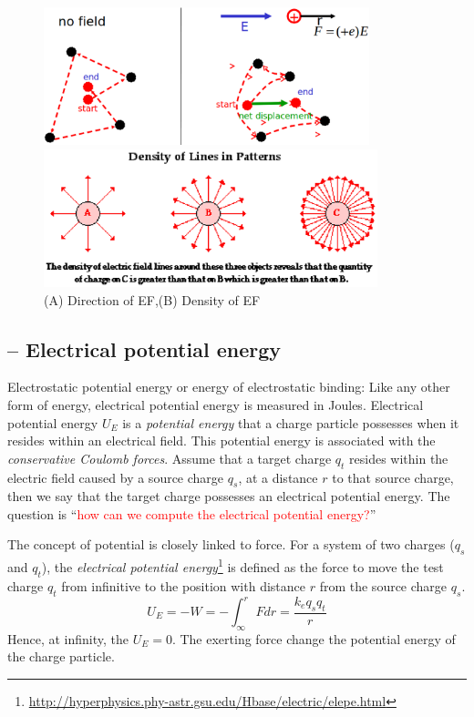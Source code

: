 \begin{figure}[htb]
  \centerline{\includegraphics[height=4cm]{./images/electric_field.eps}}
\centerline{\includegraphics[height=4cm]{./images/electric_field_density.eps}}
  \caption{(A) Direction of EF,(B) Density of EF}\label{fig:electric-field}
\end{figure}


\subsection{-- Electrical potential energy}
\label{sec:electr-potent-energy}


Electrostatic potential energy or energy of electrostatic binding:
Like any other form of energy, electrical potential energy is measured
in Joules. Electrical potential energy $U_E$ is a
{\it potential energy} that a charge particle possesses when it
resides within an electrical field.  This potential energy is
associated with the {\it conservative Coulomb forces}.  Assume that a
target charge $q_t$ resides within the electric field caused by a
source charge $q_s$, at a distance $r$ to that source charge, then we
say that the target charge possesses an electrical potential energy.
The question is
``\textcolor{red}{how can we compute the electrical potential
  energy?}''

The concept of potential is closely linked to force. For a system of
two charges ($q_s$ and $q_t$), the
{\it electrical potential
  energy}\footnote{\url{http://hyperphysics.phy-astr.gsu.edu/Hbase/electric/elepe.html}}
is defined as the force to move the test charge $q_t$ from infinitive
to the position with distance $r$ from the source charge $q_s$.
\begin{equation}
  \label{eq:123}
  U_E = -W = -\int_\infty^r Fdr = \frac{k_eq_sq_t}{r}
\end{equation}
Hence, at infinity, the $U_E = 0$. The exerting force change the
potential energy of the charge particle.


